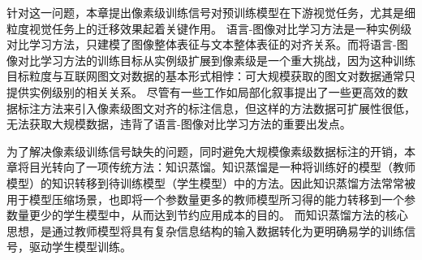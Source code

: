 

针对这一问题，本章提出像素级训练信号对预训练模型在下游视觉任务，尤其是细粒度视觉任务上的迁移效果起着关键作用。%
语言-图像对比学习方法是一种实例级对比学习方法，只建模了图像整体表征与文本整体表征的对齐关系。而将语言-图像对比学习方法的训练目标从实例级扩展到像素级是一个重大挑战，因为这种训练目标粒度与互联网图文对数据的基本形式相悖：可大规模获取的图文对数据通常只提供实例级别的相关关系。%
尽管有一些工作如局部化叙事\cite{LocNar}提出了一些更高效的数据标注方法来引入像素级图文对齐的标注信息，但这样的方法数据可扩展性很低，无法获取大规模数据，违背了语言-图像对比学习方法的重要出发点。

为了解决像素级训练信号缺失的问题，同时避免大规模像素级数据标注的开销，本章将目光转向了一项传统方法：知识蒸馏\cite{hinton2015knowledge}。知识蒸馏是一种将训练好的模型（教师模型）的知识转移到待训练模型（学生模型）中的方法。因此知识蒸馏方法常常被用于模型压缩场景，也即将一个参数量更多的教师模型所习得的能力转移到一个参数量更少的学生模型中，从而达到节约应用成本的目的。
而知识蒸馏方法的核心思想，是通过教师模型将具有复杂信息结构的输入数据转化为更明确易学的训练信号，驱动学生模型训练。

